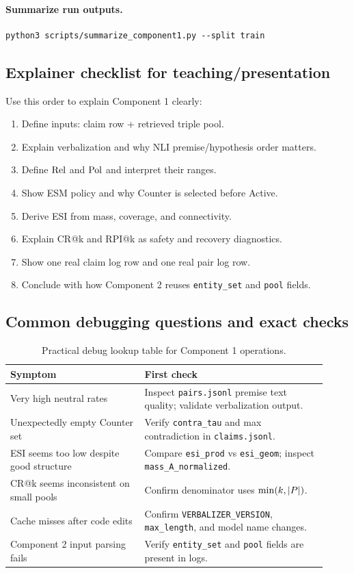 \paragraph{Summarize run outputs.}
\begin{lstlisting}[style=jsonstyle]
python3 scripts/summarize_component1.py --split train
\end{lstlisting}

\subsection{Explainer checklist for teaching/presentation}
Use this order to explain Component 1 clearly:
\begin{enumerate}
\item Define inputs: claim row + retrieved triple pool.
\item Explain verbalization and why NLI premise/hypothesis order matters.
\item Define $\operatorname{Rel}$ and $\operatorname{Pol}$ and interpret their ranges.
\item Show ESM policy and why Counter is selected before Active.
\item Derive ESI from mass, coverage, and connectivity.
\item Explain CR@k and RPI@k as safety and recovery diagnostics.
\item Show one real claim log row and one real pair log row.
\item Conclude with how Component 2 reuses \texttt{entity\_set} and \texttt{pool} fields.
\end{enumerate}

\subsection{Common debugging questions and exact checks}
\begin{table}[H]
\centering
\begin{tabular}{@{}p{0.39\linewidth}p{0.53\linewidth}@{}}
\toprule
Symptom & First check \\
\midrule
Very high neutral rates & Inspect \texttt{pairs.jsonl} premise text quality; validate verbalization output. \\
Unexpectedly empty Counter set & Verify \texttt{contra\_tau} and max contradiction in \texttt{claims.jsonl}. \\
ESI seems too low despite good structure & Compare \texttt{esi\_prod} vs \texttt{esi\_geom}; inspect \texttt{mass\_A\_normalized}. \\
CR@k seems inconsistent on small pools & Confirm denominator uses \(\min(k,|P|)\). \\
Cache misses after code edits & Confirm \texttt{VERBALIZER\_VERSION}, \texttt{max\_length}, and model name changes. \\
Component 2 input parsing fails & Verify \texttt{entity\_set} and \texttt{pool} fields are present in logs. \\
\bottomrule
\end{tabular}
\caption{Practical debug lookup table for Component 1 operations.}
\label{tab:c1_debug_table}
\end{table}

